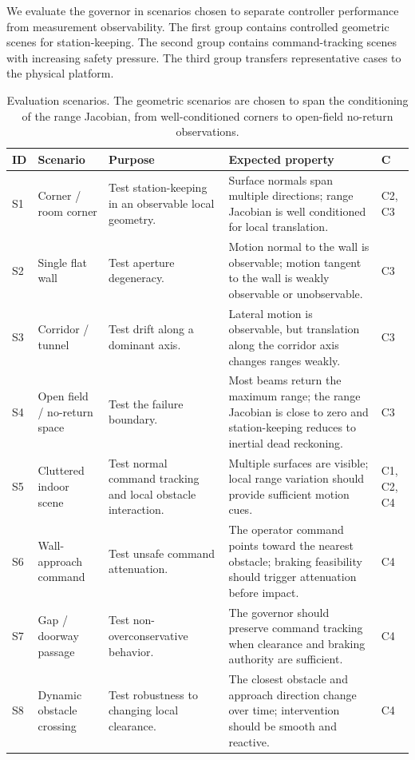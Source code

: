\documentclass[11pt]{article}
\begin{document}
We evaluate the governor in scenarios chosen to separate controller performance
from measurement observability.  The first group contains controlled geometric
scenes for station-keeping.  The second group contains command-tracking scenes
with increasing safety pressure.  The third group transfers representative
cases to the physical platform.

\begin{table}[t]
\centering
\caption{Evaluation scenarios.  The geometric scenarios are chosen to span the
conditioning of the range Jacobian, from well-conditioned corners to open-field
no-return observations.}
\label{tab:scenario_matrix}
\small
\setlength{\tabcolsep}{3pt}
\begin{tabular}{L{0.08\textwidth}L{0.18\textwidth}L{0.28\textwidth}L{0.30\textwidth}L{0.08\textwidth}}
\toprule
\textbf{ID} & \textbf{Scenario} & \textbf{Purpose} & \textbf{Expected property} & \textbf{C} \\
\midrule
S1 & Corner / room corner & Test station-keeping in an observable local geometry. & Surface normals span multiple directions; range Jacobian is well conditioned for local translation. & C2, C3 \\
S2 & Single flat wall & Test aperture degeneracy. & Motion normal to the wall is observable; motion tangent to the wall is weakly observable or unobservable. & C3 \\
S3 & Corridor / tunnel & Test drift along a dominant axis. & Lateral motion is observable, but translation along the corridor axis changes ranges weakly. & C3 \\
S4 & Open field / no-return space & Test the failure boundary. & Most beams return the maximum range; the range Jacobian is close to zero and station-keeping reduces to inertial dead reckoning. & C3 \\
S5 & Cluttered indoor scene & Test normal command tracking and local obstacle interaction. & Multiple surfaces are visible; local range variation should provide sufficient motion cues. & C1, C2, C4 \\
S6 & Wall-approach command & Test unsafe command attenuation. & The operator command points toward the nearest obstacle; braking feasibility should trigger attenuation before impact. & C4 \\
S7 & Gap / doorway passage & Test non-overconservative behavior. & The governor should preserve command tracking when clearance and braking authority are sufficient. & C4 \\
S8 & Dynamic obstacle crossing & Test robustness to changing local clearance. & The closest obstacle and approach direction change over time; intervention should be smooth and reactive. & C4 \\

\end{tabular}
\end{table}
\end{document}
